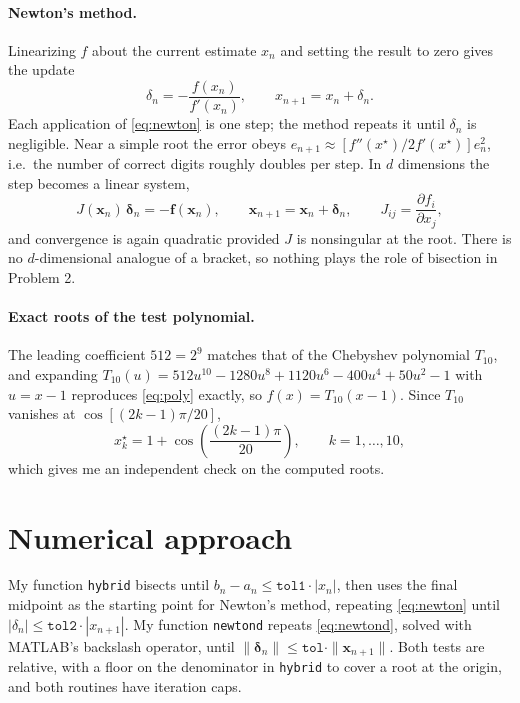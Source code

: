\documentclass[11pt]{article}
\begin{document}
\paragraph{Newton's method.} Linearizing $f$ about the current estimate $x_n$
and setting the result to zero gives the update
%
\begin{equation}
\delta_n = -\frac{f(x_n)}{f'(x_n)} , \qquad x_{n+1} = x_n + \delta_n .
\label{eq:newton}
\end{equation}
%
Each application of \eqref{eq:newton} is one step; the method repeats it until
$\delta_n$ is negligible. Near a simple root the error obeys
$e_{n+1} \approx \left[f''(x^\star)/2f'(x^\star)\right] e_n^2$, i.e.\ the
number of correct digits roughly doubles per step. In $d$ dimensions the step
becomes a linear system,
%
\begin{equation}
J(\mathbf{x}_n)\, \boldsymbol{\delta}_n = -\mathbf{f}(\mathbf{x}_n) ,
\qquad \mathbf{x}_{n+1} = \mathbf{x}_n + \boldsymbol{\delta}_n ,
\qquad J_{ij} = \frac{\partial f_i}{\partial x_j} ,
\label{eq:newtond}
\end{equation}
%
and convergence is again quadratic provided $J$ is nonsingular at the root.
There is no $d$-dimensional analogue of a bracket, so nothing plays the role
of bisection in Problem 2.

\paragraph{Exact roots of the test polynomial.} The leading coefficient
$512 = 2^9$ matches that of the Chebyshev polynomial $T_{10}$, and expanding
$T_{10}(u) = 512u^{10} - 1280u^8 + 1120u^6 - 400u^4 + 50u^2 - 1$ with
$u = x - 1$ reproduces \eqref{eq:poly} exactly, so $f(x) = T_{10}(x-1)$. Since
$T_{10}$ vanishes at $\cos[(2k-1)\pi/20]$,
%
\begin{equation}
x_k^\star = 1 + \cos\!\left(\frac{(2k-1)\pi}{20}\right) ,
\qquad k = 1, \dots, 10 ,
\label{eq:exact}
\end{equation}
%
which gives me an independent check on the computed roots.

\section{Numerical approach}

My function \texttt{hybrid} bisects until $b_n - a_n \le
\texttt{tol1}\cdot|x_n|$, then uses the final midpoint as the starting point
for Newton's method, repeating \eqref{eq:newton} until
$|\delta_n| \le \texttt{tol2}\cdot|x_{n+1}|$. My function \texttt{newtond}
repeats \eqref{eq:newtond}, solved with MATLAB's backslash operator, until
$\|\boldsymbol{\delta}_n\| \le \texttt{tol}\cdot\|\mathbf{x}_{n+1}\|$. Both
tests are relative, with a floor on the denominator in \texttt{hybrid} to cover
a root at the origin, and both routines have iteration caps.
\end{document}

